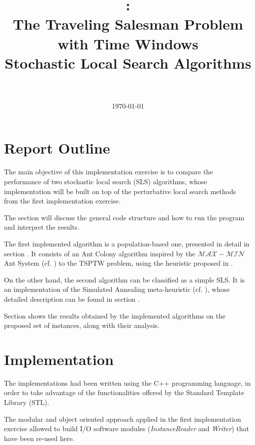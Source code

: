 \documentclass{article}
\title{
\vspace{2in}
\textmd{\textbf{\hmwkClass:\\ The Traveling Salesman Problem with Time Windows \\ Stochastic Local Search Algorithms}}\\
\vspace{0.1in}\large{\textit{\hmwkClassInstructor\ }}
\vspace{3in}
}
\author{\textbf{\hmwkAuthorName}}
\date{\today} %
\newcommand{\maxmin}{$\mathcal{MAX}-\mathcal{MIN}$}
\begin{document}
\maketitle



\newpage
\tableofcontents
\newpage

\section{Report Outline}
The main objective of this implementation exercise is to compare the performance of two stochastic local search (SLS) algorithms, whose implementation will be built on top of the perturbative local search methods from the first implementation exercise.

The  section will discuss the general code structure and how to run the program and interpret the results.

The first implemented algorithm is a population-based one, presented in detail in section .
It consists of an Ant Colony algorithm inspired by the \maxmin Ant System (cf. \cite{stutzle2000max}) to the TSPTW problem, using the heuristic proposed in \cite{lopez2010beam}. 

On the other hand, the second algorithm can be classified as a simple SLS.
It is an implementation of the Simulated Annealing meta-heuristic (cf. \cite{kirkpatrick1983optimization}), whose detailed description can be found in section .

Section  shows the results obtained by the implemented algorithms on the proposed set of instances, along with their analysis.

\section{Implementation}\label{impl}
The implementations had been written using the C++ programming language, in order to take advantage of the functionalities offered by the Standard Template Library (STL).

The modular and object oriented approach applied in the first implementation exercise allowed to build I/O software modules (\emph{InstanceReader} and \emph{Writer}) that have been re-used here.
\end{document}
